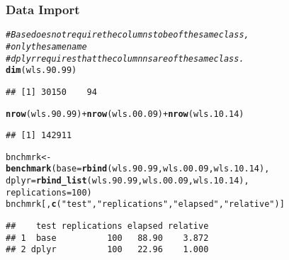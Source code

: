\documentclass{beamer}\usepackage[]{graphicx}\usepackage[]{color}
\makeatletter
\newcommand{\hlnum}[1]{\textcolor[rgb]{0.686,0.059,0.569}{#1}}%
\newcommand{\hlstr}[1]{\textcolor[rgb]{0.192,0.494,0.8}{#1}}%
\newcommand{\hlcom}[1]{\textcolor[rgb]{0.678,0.584,0.686}{\textit{#1}}}%
\newcommand{\hlopt}[1]{\textcolor[rgb]{0,0,0}{#1}}%
\newcommand{\hlstd}[1]{\textcolor[rgb]{0.345,0.345,0.345}{#1}}%
\newcommand{\hlkwb}[1]{\textcolor[rgb]{0.69,0.353,0.396}{#1}}%
\newcommand{\hlkwc}[1]{\textcolor[rgb]{0.333,0.667,0.333}{#1}}%
\newcommand{\hlkwd}[1]{\textcolor[rgb]{0.737,0.353,0.396}{\textbf{#1}}}%
\newenvironment{kframe}{%
 \def\at@end@of@kframe{}%
 \ifinner\ifhmode%
  \def\at@end@of@kframe{\end{minipage}}%
  \begin{minipage}{\columnwidth}%
 \fi\fi%
 \def\FrameCommand##1{\hskip\@totalleftmargin \hskip-\fboxsep
 \colorbox{shadecolor}{##1}\hskip-\fboxsep
     \hskip-\linewidth \hskip-\@totalleftmargin \hskip\columnwidth}%
 \MakeFramed {\advance\hsize-\width
   \@totalleftmargin\z@ \linewidth\hsize
   \@setminipage}}%
 {\par\unskip\endMakeFramed%
 \at@end@of@kframe}
\newenvironment{knitrout}{}{} %
\makeatother
\begin{document}
\begin{frame}[fragile]
  \frametitle{Data Import}
\begin{knitrout}\footnotesize
{}\color{fgcolor}\begin{kframe}
\begin{alltt}
\hlcom{# Base does not require the columns to be of the same class,}
\hlcom{# only the same name}
\hlcom{# dplyr requires that the columnns are of the same class.}
\hlkwd{dim}\hlstd{(wls.90.99)}
\end{alltt}
\begin{verbatim}
## [1] 30150    94
\end{verbatim}
\begin{alltt}
\hlkwd{nrow}\hlstd{(wls.90.99)} \hlopt{+} \hlkwd{nrow}\hlstd{(wls.00.09)} \hlopt{+} \hlkwd{nrow}\hlstd{(wls.10.14)}
\end{alltt}
\begin{verbatim}
## [1] 142911
\end{verbatim}
\begin{alltt}
\hlstd{bnchmrk} \hlkwb{<-}
  \hlkwd{benchmark}\hlstd{(}\hlkwc{base} \hlstd{=} \hlkwd{rbind}\hlstd{(wls.90.99, wls.00.09, wls.10.14),}
            \hlkwc{dplyr} \hlstd{=} \hlkwd{rbind_list}\hlstd{(wls.90.99, wls.00.09, wls.10.14),}
            \hlkwc{replications} \hlstd{=} \hlnum{100}\hlstd{)}
\hlstd{bnchmrk[,} \hlkwd{c}\hlstd{(}\hlstr{"test"}\hlstd{,} \hlstr{"replications"}\hlstd{,} \hlstr{"elapsed"}\hlstd{,} \hlstr{"relative"}\hlstd{)]}
\end{alltt}
\begin{verbatim}
##    test replications elapsed relative
## 1  base          100   88.90    3.872
## 2 dplyr          100   22.96    1.000
\end{verbatim}
\end{kframe}
\end{knitrout}
\end{frame} 
\end{document}
